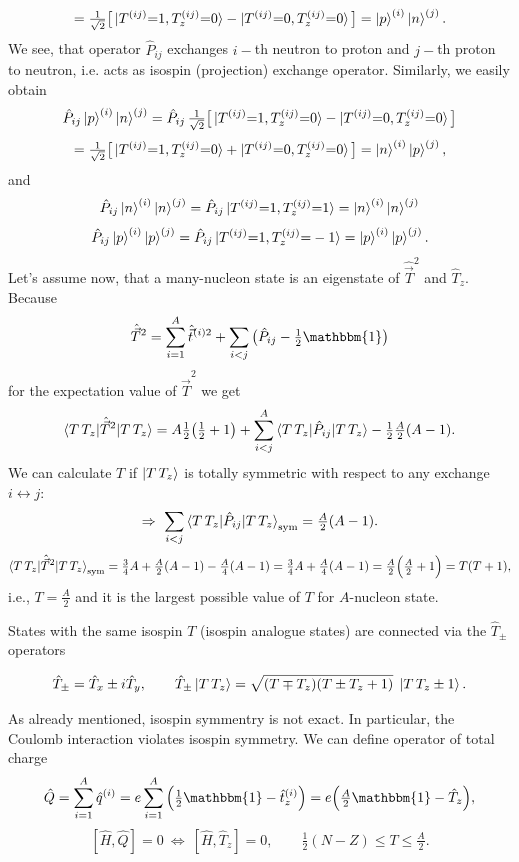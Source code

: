 \documentclass[11pt,a4paper]{article}
\newcommand{\op}[1]{\hat{#1}}
\begin{document}
\[
=\tfrac{1}{\sqrt2}\big[\ket{T^{(ij)}{=}1,T^{(ij)}_z{=}0}-\ket{T^{(ij)}{=}0,T^{(ij)}_z{=}0}\big]=\ket p^{(i)}\ket n^{(j)}.
\]
We see, that operator $\op P_{ij}$ exchanges $i-$th neutron to proton and $j-$th proton to neutron, i.e. acts as isospin (projection) exchange operator. 
Similarly, we easily obtain 
\[
\op P_{ij}\ket p^{(i)}\ket n^{(j)}
=\op P_{ij}\,\tfrac{1}{\sqrt2}\big[\ket{T^{(ij)}{=}1,T^{(ij)}_z{=}0}-\ket{T^{(ij)}{=}0,T_z^{(ij)}{=}0}\big]
\]
\[
=\tfrac{1}{\sqrt2}\big[\ket{T^{(ij)}{=}1,T^{(ij)}_z{=}0}+\ket{T^{(ij)}{=}0,T^{(ij)}_z{=}0}\big]=\ket n^{(i)}\ket p^{(j)}, 
\]
and 
\[
\op P_{ij}\ket n^{(i)}\ket n^{(j)}=\op P_{ij}\ket{T^{(ij)}{=}1,T_z^{(ij)}{=}1}=\ket n^{(i)}\ket n^{(j)}
\]
\[
\op P_{ij}\ket p^{(i)}\ket p^{(j)}=\op P_{ij}\ket{T^{(ij)}{=}1,T_z^{(ij)}{=}-1}=\ket p^{(i)}\ket p^{(j)}.
\]
Let's assume now, that a many-nucleon state is an eigenstate of ${\op {\vec T}^2}$ and 
${\op T_z}$. Because 
\[
\op {\vec T}^2=\sum_{i=1}^A \op{\vec t}^{(i)2}+\sum_{i<j}\big(\op P_{ij}-\tfrac12 \mathbbm{1}\big)
\] for the expectation value of ${\op {\vec T}^2}$ we get 
\[
\braket{T\,T_z|\op {\vec T}^2|T\,T_z}
= A\tfrac12\big(\tfrac12+1\big)+\sum_{i<j}^{A}\braket{T\,T_z|\op P_{ij}|T\,T_z}
-\tfrac12\tfrac{A}{2}(A-1).
\]
We can calculate $T$ if $\ket{T\,T_z}$ is totally symmetric with respect to
any exchange $i\leftrightarrow j$:
\[
\Rightarrow\ \sum_{i<j}\braket{T\,T_z|\op P_{ij}|T\,T_z}_{\rm sym}=\tfrac{A}{2}(A-1) .
\]
\[
\braket{T\,T_z|\op {\vec T}^2|T\,T_z}_{\rm sym}
=\tfrac34 A+\tfrac{A}{2}(A-1)-\tfrac{A}{4}(A-1)
=\tfrac34 A+\tfrac{A}{4}(A-1)=\tfrac{A}{2}\Big(\tfrac{A}{2}+1\Big)=T(T+1),
\]
i.e., $T=\frac{A}{2}$ and it is the largest possible value of $T$ for $A$-nucleon state. 

States with the same isospin $T$ (isospin analogue states) are connected via the $\op T_\pm$ operators

\[
\op T_\pm=\op T_x\pm i\op T_y, \qquad
\op T_\pm\ket{T\,T_z}=\sqrt{(T\mp T_z)(T\pm T_z+1)}\;\ket{T\,T_z\pm1}.
\]


\par
As already mentioned, isospin symmentry is not exact. In particular, the Coulomb interaction violates isospin symmetry. We can define operator of total charge
\[
\op Q=\sum_{i=1}^A \op q^{(i)}=e\sum_{i=1}^A\Big(\tfrac12 \mathbbm{1} -\op t_z^{(i)}\Big)
=e\Big(\tfrac{A}{2} \mathbbm{1} -\op T_z\Big),
\]
\[
[\op H,\op Q]=0 \ \Longleftrightarrow\ [\op H,\op T_z]=0,
\qquad
\tfrac12(N-Z)\le T\le \tfrac{A}{2}.
\]
\end{document}
